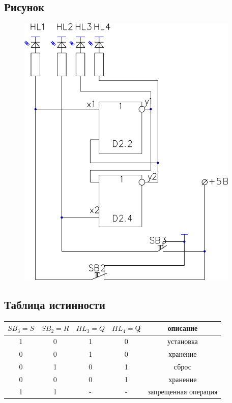 \documentclass[a4paper]{article}
\begin{document}
\subsection{Рисунок}
\begin{figure}[H]
    \centering
    \includegraphics[width=300pt]{s1.png}
\end{figure}



\subsection{Таблица истинности}
\begin{table}[H]
\centering
\begin{tabular}{|c|c|c|c|c|}
\hline
$SB_3 = S$ & $SB_2 = R$ & $HL_3 = Q$ & $HL_4 = \not Q$ & описание \\
\hline
1 & 0 & 1 & 0 & установка\\
0 & 0 & 1 & 0 & хранение\\
0 & 1 & 0 & 1 & сброс \\
0 & 0 & 0 & 1 & хранение \\
1 & 1 & - & - & запрещенная операция \\
\hline
\end{tabular}
\end{table}
\end{document}
